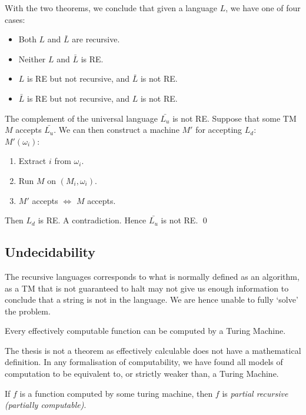 With the two theorems, we conclude that given a language $L $, we have one of four cases:
\begin{itemize}
  \item Both $L$ and $\bar{L}$ are recursive.
  \item Neither $L$ and $\bar{L}$ is RE.
  \item $L$ is RE but not recursive, and $ \bar{L}$ is not RE.
  \item $\bar{L}$ is RE but not recursive, and ${L}$ is not RE.
\end{itemize}

\begin{example}
  The complement of the universal language $\bar{L_u}$ is not RE. Suppose that
  some TM $M$ accepts  $\bar{L_u}$. We can then construct a machine $M'$ for
  accepting $L_d$:\\
  $M'(\omega_i):$
  \begin{enumerate}
    \item Extract $i$ from $\omega_i$.
    \item Run $M$ on $\left( M_i,\omega_i \right) $.
    \item $M'$ accepts $\iff$ $M$ accepts.
  \end{enumerate}
  Then $L_d$ is RE. A contradiction. Hence $\bar{L_u}$ is not RE. \qed
\end{example}

\subsection{Undecidability}
The recursive languages corresponds to what is normally defined as an
algorithm, as a TM that is not guaranteed to halt may not give us enough
information to conclude that a string is not in the language. We are hence
unable to fully `solve' the problem.

\begin{theorem}
  Every effectively computable function can be computed by a Turing Machine.
\end{theorem}
The thesis is not a theorem as effectively calculable does not have a
mathematical definition. In any formalisation of computability, we have found
all models of computation to be equivalent to, or strictly weaker than, a
Turing Machine. 

\begin{definition}
  If $f$ is a function computed by some turing machine, then $f$ is
  \textit{partial recursive (partially computable)}.
\end{definition}

